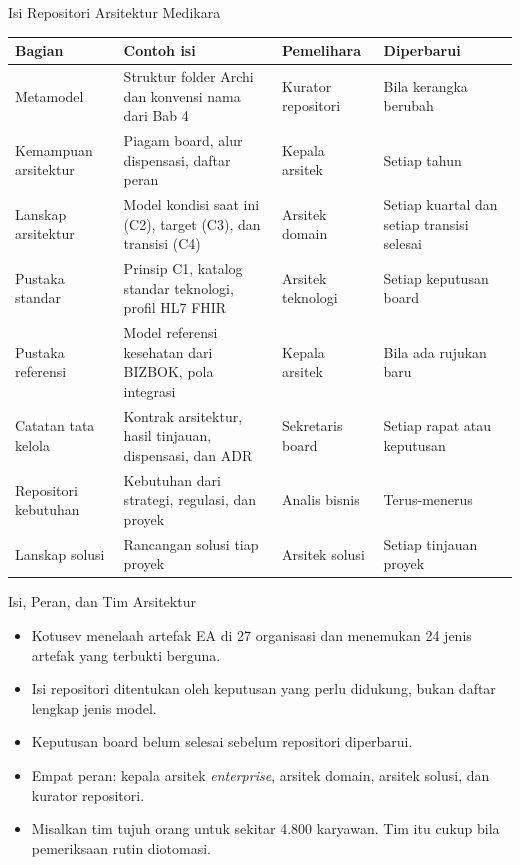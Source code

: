 \documentclass[aspectratio=169, table, 12pt]{beamer}
\begin{document}
\begin{frame}{{\Large Isi Repositori Arsitektur Medikara}}
  \scriptsize
  \begin{tabularx}{\textwidth}{L{2.5cm}YL{2.3cm}L{2.7cm}}
    \hline
    \textbf{Bagian} & \textbf{Contoh isi} & \textbf{Pemelihara} & \textbf{Diperbarui} \\
    \hline
    Metamodel & Struktur folder Archi dan konvensi nama dari Bab 4 &
      Kurator repositori & Bila kerangka berubah \\
    \hline
    Kemampuan arsitektur & Piagam board, alur dispensasi, daftar peran &
      Kepala arsitek & Setiap tahun \\
    \hline
    Lanskap arsitektur & Model kondisi saat ini (C2), target (C3), dan
      transisi (C4) & Arsitek domain & Setiap kuartal dan setiap transisi
      selesai \\
    \hline
    Pustaka standar & Prinsip C1, katalog standar teknologi, profil HL7 FHIR
      & Arsitek teknologi & Setiap keputusan board \\
    \hline
    Pustaka referensi & Model referensi kesehatan dari BIZBOK, pola
      integrasi & Kepala arsitek & Bila ada rujukan baru \\
    \hline
    Catatan tata kelola & Kontrak arsitektur, hasil tinjauan, dispensasi,
      dan ADR & Sekretaris board & Setiap rapat atau keputusan \\
    \hline
    Repositori kebutuhan & Kebutuhan dari strategi, regulasi, dan proyek &
      Analis bisnis & Terus-menerus \\
    \hline
    Lanskap solusi & Rancangan solusi tiap proyek & Arsitek solusi & Setiap
      tinjauan proyek \\
    \hline
  \end{tabularx}
\end{frame}

\begin{frame}{{\Large Isi, Peran, dan Tim Arsitektur}}
  \small
  \vspace{6pt}
  \begin{itemize}
    \item Kotusev menelaah artefak EA di 27 organisasi dan menemukan 24 jenis artefak yang terbukti
          berguna.
    \item Isi repositori ditentukan oleh keputusan yang perlu didukung, bukan daftar lengkap jenis model.
    \item Keputusan board belum selesai sebelum repositori diperbarui.
    \item Empat peran: kepala arsitek \textit{enterprise}, arsitek domain, arsitek solusi, dan kurator
          repositori.
    \item Misalkan tim tujuh orang untuk sekitar 4.800 karyawan. Tim itu cukup bila pemeriksaan rutin
          diotomasi.
  \end{itemize}
\end{frame}
\end{document}
